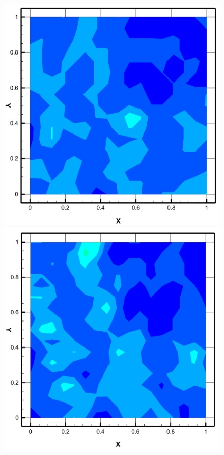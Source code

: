 \begin{figure}
    \centering
    \quad
  \begin{minipage}[b]{0.45\textwidth}
    \includegraphics[width=\textwidth]{figures/Neutral1.png}
  \end{minipage} %
  \begin{minipage}[b]{0.45\textwidth}
    \includegraphics[width=\textwidth]{figures/Neutral2.png}

\end{minipage}
\end{figure}
